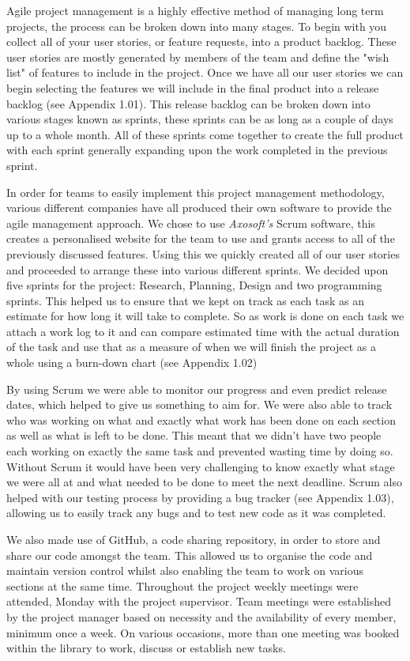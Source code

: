 \documentclass[a4paper]{report}
\begin{document}
Agile project management is a highly effective method of managing long term projects, the process can be broken down into many stages. To begin with you collect all of your user stories, or feature requests, into a product backlog. These user stories are mostly generated by members of the team and define the "wish list" of features to include in the project. Once we have all our user stories we can begin selecting the features we will include in the final product into a release backlog (see Appendix 1.01). This release backlog can be broken down into various stages known as sprints, these sprints can be as long as a couple of days up to a whole month. All of these sprints come together to create the full product with each sprint generally expanding upon the work completed in the previous sprint.

In order for teams to easily implement this project management methodology, various different companies have all produced their own software to provide the agile management approach. We chose to use \textit{Axosoft's} Scrum software, this creates a personalised website for the team to use and grants access to all of the previously discussed features. Using this we quickly created all of our user stories and proceeded to arrange these into various different sprints. We decided upon five sprints for the project: Research, Planning, Design and two programming sprints. This helped us to ensure that we kept on track as each task as an estimate for how long it will take to complete. So as work is done on each task we attach a work log to it and can compare estimated time with the actual duration of the task and use that as a measure of when we will finish the project as a whole using a burn-down chart (see Appendix 1.02)

By using Scrum we were able to monitor our progress and even predict release dates, which helped to give us something to aim for. We were also able to track who was working on what and exactly what work has been done on each section as well as what is left to be done. This meant that we didn't have two people each working on exactly the same task and prevented wasting time by doing so. Without Scrum it would have been very challenging to know exactly what stage we were all at and what needed to be done to meet the next deadline. Scrum also helped with our testing process by providing a bug tracker (see Appendix 1.03), allowing us to easily track any bugs and to test new code as it was completed. 

We also made use of GitHub, a code sharing repository, in order to store and share our code amongst the team. This allowed us to organise the code and maintain version control whilst also enabling the team to work on various sections at the same time. Throughout the project weekly meetings were attended, Monday with the project supervisor. Team meetings were established by the project manager based on necessity and the availability of every member, minimum once a week. On various occasions, more than one meeting was booked within the library to work, discuss or establish new tasks.
\end{document}
